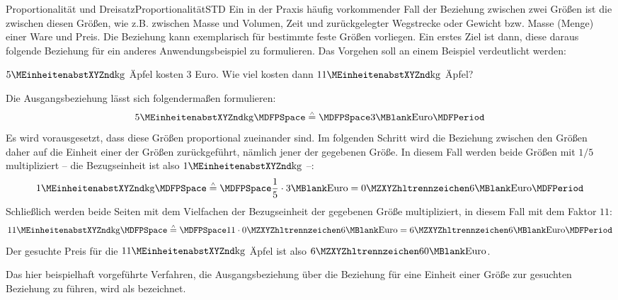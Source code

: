 \begin{MXContent}{Proportionalität und Dreisatz}{Proportionalität}{STD}
Ein in der Praxis häufig vorkommender Fall der Beziehung zwischen zwei
Größen ist die   zwischen
diesen Größen, wie z.B. zwischen 
Masse und Volumen, Zeit und zurückgelegter Wegstrecke oder Gewicht bzw. 
Masse (Menge) einer Ware und Preis. Die Beziehung kann exemplarisch für
bestimmte feste Größen vorliegen. Ein erstes Ziel ist dann, diese daraus
folgende Beziehung für ein anderes Anwendungsbeispiel zu formulieren.
Das Vorgehen soll an einem Beispiel verdeutlicht werden:
\begin{MExample}
$5\MEinheit{kg}$ Äpfel kosten $3$ Euro. Wie viel kosten dann $11\MEinheit{kg}$
Äpfel?
\par
Die Ausgangsbeziehung lässt sich folgendermaßen formulieren:
$$
5\MEinheit{kg} \MDFPSpace \MRelates \MDFPSpace 3\MBlank \text{Euro}
\MDFPeriod
$$
Es wird vorausgesetzt, dass diese Größen proportional zueinander sind.
Im folgenden Schritt wird die Beziehung zwischen den Größen daher auf 
die Einheit einer der Größen zurückgeführt, nämlich jener der gegebenen 
Größe. In diesem Fall werden beide Größen mit $1/5$ multipliziert --
die Bezugseinheit ist also $1\MEinheit{kg}$ --:
$$
1\MEinheit{kg} \MDFPSpace \MRelates \MDFPSpace 
\frac{1}{5}\cdot 3\MBlank \text{Euro} = \MZahl{0}{6}\MBlank \text{Euro}
\MDFPeriod
$$
Schließlich werden beide Seiten mit dem Vielfachen der Bezugseinheit der
gegebenen Größe multipliziert, in diesem Fall mit dem Faktor $11$:
$$
11\MEinheit{kg} \MDFPSpace \MRelates \MDFPSpace 
11\cdot\MZahl{0}{6}\MBlank \text{Euro} = \MZahl{6}{6}\MBlank \text{Euro}
\MDFPeriod
$$
Der gesuchte Preis für die $11\MEinheit{kg}$ Äpfel ist also
$\MZahl{6}{60}\MBlank \text{Euro}$.
\end{MExample}
Das hier beispielhaft vorgeführte Verfahren, die Ausgangsbeziehung über
die Beziehung für eine Einheit einer Größe zur gesuchten Beziehung zu führen,
wird als  bezeichnet.


\end{MXContent}
